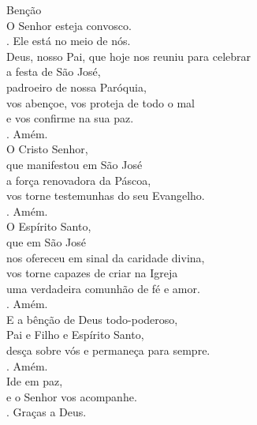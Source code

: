 \documentclass{book}
\begin{document}
\begin{flushleft}
    \textcolor{VioletRed2}{Benção}
    \vspace{.2cm} \\
    O Senhor esteja convosco. \\
    {\color{VioletRed2} \Rbar.} Ele está no meio de nós.
    \vspace{.2cm} \\
    Deus, nosso Pai, que hoje nos reuniu para celebrar \\
    a festa de São José, \\
    padroeiro de nossa Paróquia, \\
    vos abençoe, vos proteja de todo o mal \\
    e vos confirme na sua paz. \\
    {\color{VioletRed2} \Rbar.} Amém.
    \vspace{.2cm} \\
    O Cristo Senhor, \\
    que manifestou em São José \\
    a força renovadora da Páscoa, \\
    vos torne testemunhas do seu Evangelho. \\
    {\color{VioletRed2} \Rbar.} Amém.
    \vspace{.2cm} \\
    O Espírito Santo, \\
    que em São José \\
    nos ofereceu em sinal da caridade divina, \\
    vos torne capazes de criar na Igreja \\
    uma verdadeira comunhão de fé e amor. \\
    {\color{VioletRed2} \Rbar.} Amém.
    \vspace{.2cm} \\
    E a bênção de Deus todo-poderoso, \\
    Pai e Filho \grecrossRed{} e Espírito Santo, \\
    desça sobre vós e permaneça para sempre.
    \vspace{.2cm} \\
    {\color{VioletRed2} \Rbar.} Amém.
    \vspace{.2cm} \\
    Ide em paz, \\
    e o Senhor vos acompanhe.
    \vspace{.2cm} \\
    {\color{VioletRed2} \Rbar.} Graças a Deus.

\end{flushleft}
\end{document}
